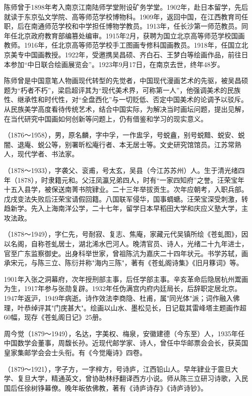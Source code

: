 \begin{description}
        陈师曾于1898年考入南京江南陆师学堂附设矿务学堂。1902年，赴日本留学，先后就读于东京弘文学院、高等师范学校博物科。1909年，返回中国，在江西教育司任职，后在南通师范学校和中学担任博物学教员。1913年，任长沙第一师范教员。同年任北京政府教育部编篡处编审。1915年2月，获聘为国立北京高等师范学校国画教师。1916年，任北京高等师范学校手工图画专修科国画教员。1918年，任国立北京美专中国画教授。1922年，受邀携吴昌硕、齐白石、王梦白等绘画作品，前往日本参加“中日联合绘画展览会”。1923年9月17日，在南京去世，终年48岁。\par
        陈师曾是中国意笔人物画现代转型的先觉者，中国现代漫画艺术的先驱，被吴昌硕题为“朽者不朽”，梁启超评其为“现代美术界，可称第一人”，他强调美术的民族性、继承性和时代性，对“全盘西化”与一切贬低、否定中国美术的论调予以驳斥。从民族美学高度看待传统艺术，结合中国实际，为解决当时画坛问题，提出见解，在当代研究中国画如何创新等问题上，仍有借鉴和学习的现实意义。
  \item[萧蜕] （1876～1958），男，原名麟，字中孚，一作盅孚，号蜕盦，别号蜕黯、蜕安、蜕闇、退庵、蜕公等，别署昕松庵行者、本无居士等。文史研究馆馆员。江苏常熟人，现代学者、书法家。
  \item[汪荣宝] （1878～1933），字袭父、衮甫，号太玄，吴县（今江苏苏州）人。生于清光绪四年（1878），时隶籍元和。父汪凤瀛兄弟四人，时有“一家四知府”之誉。汪荣宝年十五入县学，被保送南菁书院肄业。二十三年举拔贡生。次年应朝考，入职兵部。戊戌变法失败后汪荣宝请假回籍。八国联军侵华，国事蜩螗。汪荣宝深受刺激，转趋新学。先入上海南洋公学，二十七年，留学日本早稻田大学和庆应义塾大学，主攻法政。
  \item[陈曾寿] （1878～1949），字仁先，号耐寂、复志、焦庵，家藏元代吴镇所绘《苍虬图》，因以名阁，自称苍虬居士，湖北浠水巴河人。晚清官员、诗人，光绪二十九年进士，官至广东监察御史。出身科举世家，曾祖陈沆为嘉庆二十四年状元。书学苏轼，画承宋元，与陈三立、陈衍并称"海内三陈"，著有《苍虬阁诗集》《旧月簃词》等。\par
        1901年入张之洞幕府，次年授刑部主事，后任学部主事。辛亥革命后隐居杭州鬻画为生，1917年参与张勋复辟。1932年任伪满宫内府内廷局长，后辞职定居北京。1947年返沪，1949年病逝。诗作效法李商隐、杜甫，属"同光体"派；词作融入佛理，叶恭绰评其"门庑甚大"。绘画以山水、墨松见长，日记载其雷峰塔主题画作超60幅，现存《苍虬阁日记》25册。
  \item[周达] 周今觉（1879～1949），名达，字美权、梅泉，安徽建德（今东至）人，1935年任中国数学会董事，周馥长孙。近现代邮学家、诗人，曾任中华邮票会会长，获英国皇家集邮学会会士头衔。有《今觉庵诗》四卷。
  \item[胡朝梁] （1879～1921），字子方，一字梓方，号诗庐，江西铅山人。早年肄业于震旦大学、复旦大学，精通英文，曾协助林纾翻译西方小说。师从陈三立研习诗歌，入民国后任徐树铮幕僚。晚年皈依佛教，著有《诗庐诗存》《诗庐诗钞》。\par

\end{description}
